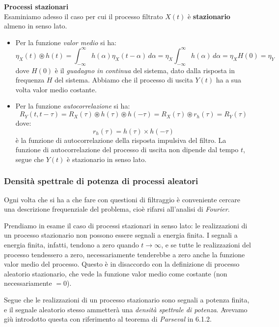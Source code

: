 \documentclass[a4paper,11pt]{article}
\begin{document}
\par\smallskip
\noindent
\textbf{\textsf{Processi stazionari}} \\
\noindent
Esaminiamo adesso il caso per cui il processo filtrato $X(t)$ è \textbf{stazionario} almeno in senso lato.
\begin{itemize}
\item Per la funzione \textit{valor medio} si ha:
$$
\eta_X(t) \circledast h(t) = \int_{-\infty}^{\infty} h(\alpha) \eta_X(t - \alpha) \, d\alpha = \eta_X \int_{-\infty}^{\infty} h(\alpha) \, d\alpha = \eta_X H(0) = \eta_Y
$$
dove $H(0)$ è il \textit{guadagno in continua} del sistema, dato dalla risposta in frequenza $H$ del sistema. Abbiamo che il processo di uscita $Y(t)$ ha a sua volta valor medio costante.

\item Per la funzione \textit{autocorrelazione} si ha:
$$
R_Y(t, t - \tau) = R_X(\tau) \circledast h(\tau) \circledast h(-\tau) = R_X(\tau) \circledast r_h(\tau) = R_Y(\tau) 
$$
dove:
$$
r_h(\tau) = h(\tau) \times h(-\tau)
$$
è la funzione di autocorrelazione della risposta impulsiva del
filtro. La funzione di autocorrelazione del processo di uscita non dipende dal tempo $t$, segue che $Y(t)$ è stazionario in senso lato.
\end{itemize}

\subsubsection{Densità spettrale di potenza di processi aleatori}
Ogni volta che si ha a che fare con questioni di filtraggio è conveniente cercare una descrizione frequenziale del problema, cioè rifarsi all'analisi di \textit{Fourier}. 

Prendiamo in esame il caso di processi stazionari in senso lato: le realizzazioni di un processo stazionario non possono essere segnali a energia finita. I segnali a energia finita, infatti, tendono a zero quando $t\rightarrow \infty$, e se tutte le realizzazioni del processo tendessero a zero, necessariamente tenderebbe a zero anche la funzione valor medio del processo. Questo è in disaccordo con la definizione di processo aleatorio stazionario, che vede la funzione valor medio come costante (non necessariamente $= 0$). 

Segue che le realizzazioni di un processo stazionario sono segnali a potenza finita, e il segnale aleatorio stesso ammetterà una \textit{densità spettrale di potenza}. Avevamo giù introdotto questa con riferimento al teorema di \textit{Parseval} in 6.1.2.
\end{document}
